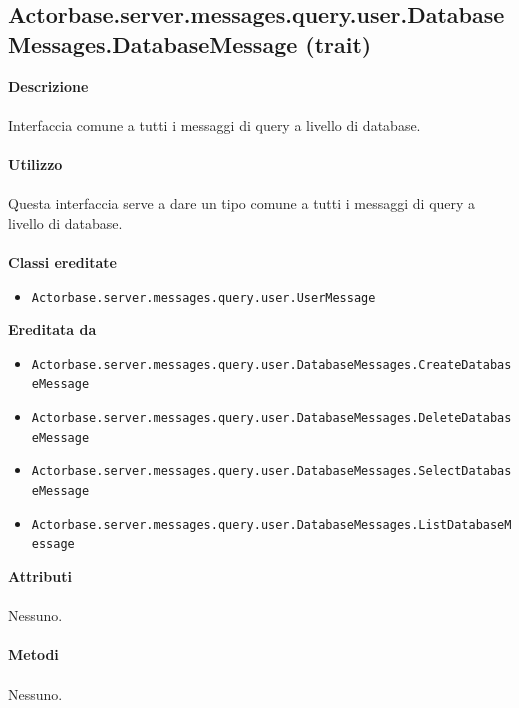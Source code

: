 \documentclass[a4paper]{article}
\begin{document}
	\subsection{Actorbase.server.messages.query.user.DatabaseMessages.DatabaseMessage (trait)}
		\textbf{Descrizione}
			\\ \\
		Interfaccia comune a tutti i messaggi di query a livello di database.
			\\ \\
		\textbf{Utilizzo}
			\\ \\
		Questa interfaccia serve a dare un tipo comune a tutti i messaggi di query a livello di database.
			\\ \\
		\textbf{Classi ereditate}
			\begin{itemize}
				\item \texttt{Actorbase.server.messages.query.user.UserMessage }
			\end{itemize}
		\textbf{Ereditata da}
			\begin{itemize}
				\item \texttt{Actorbase.server.messages.query.user.DatabaseMessages.CreateDatabaseMessage }
				\item \texttt{Actorbase.server.messages.query.user.DatabaseMessages.DeleteDatabaseMessage }
				\item \texttt{Actorbase.server.messages.query.user.DatabaseMessages.SelectDatabaseMessage }
				\item \texttt{Actorbase.server.messages.query.user.DatabaseMessages.ListDatabaseMessage }
			\end{itemize}
		\textbf{Attributi}
			\\ \\
			Nessuno.
			\\ \\
		\textbf{Metodi}
			\\ \\
			Nessuno.	
			
\end{document}
